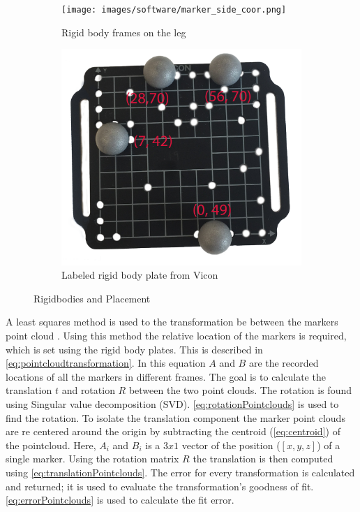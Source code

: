 \begin{figure}
\centering 
\begin{subfigure}{0.4\linewidth} 
  \centering 
  \texttt{[image: images/software/marker\_side\_coor.png]} 
  \caption[RigidBody Frames]{Rigid body frames on the leg} 
  \label{fig:markers_side} 
\end{subfigure} 
%
\begin{subfigure}{0.4\linewidth} 
  \centering 
    \centering
    \includegraphics[scale=0.11]{images/software/rigidbody_label.png} 
    \caption{Labeled rigid body plate from Vicon}
    \label{fig:rigidbody}
\end{subfigure} 
\caption[Rigidbodies and Placement]{Rigidbodies and Placement} 
\label{fig:markers} 

\end{figure} 

A least squares method is used to the transformation be between the markers point cloud \cite{arun1987least}. Using this method the relative location of the markers is required, which is set using the rigid body plates. This is described in \autoref{eq:pointcloudtransformation}. In this equation $A$ and $B$ are the recorded locations of all the markers in different frames. The goal is to calculate the translation $t$ and rotation $R$ between the two point clouds. The rotation is found using Singular value decomposition (SVD). \autoref{eq:rotationPointclouds} is used to find the rotation. To isolate the translation component the marker point clouds are re centered around the origin by subtracting the centroid (\autoref{eq:centroid}) of the pointcloud. Here, $A_i$ and $B_i$ is a $3x1$ vector of the position ($[x,y,z]$) of a single marker. Using the rotation matrix $R$ the translation is then computed using  \autoref{eq:translationPointclouds}.  The error for every transformation is calculated and returned; it is used to evaluate the transformation's goodness of fit. \autoref{eq:errorPointclouds} is used to calculate the fit error.   


